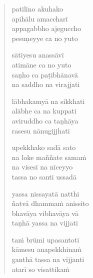 
\clearpage
\begin{verse}

patilīno akuhako\\
apihālu amaccharī\\
appagabbho ajeguccho\\
pesuṇeyye ca no yuto

sātiyesu anassāvī\\
atimāne ca no yuto\\
saṇho ca paṭibhānavā\\
na saddho na virajjati

lābhakamyā na sikkhati\\
alābhe ca na kuppati\\
aviruddho ca taṇhāya\\
rasesu nānugijjhati

upekkhako sadā sato\\
na loke maññate samaṁ\\
na visesī na nīceyyo\\
tassa no santi ussadā

yassa nissayatā natthi\\
ñatvā dhammaṁ anissito\\
bhavāya vibhavāya vā\\
taṇhā yassa na vijjati

taṁ brūmi upasantoti\\
kāmesu anapekkhinaṁ\\
ganthā tassa na vijjanti\\
atarī so visattikaṁ

\end{verse}


